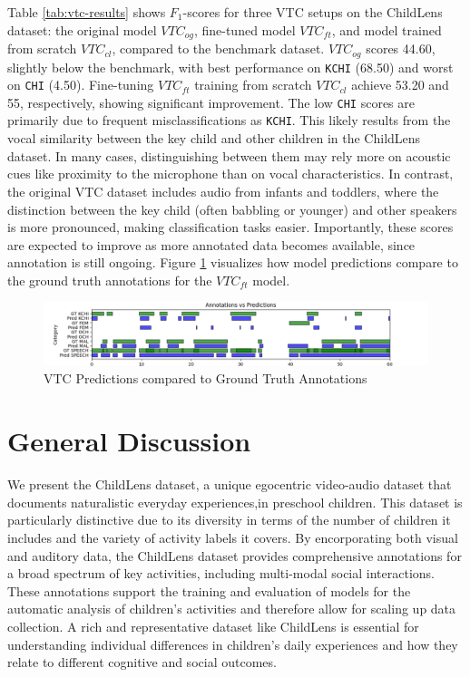 \documentclass[
  man,floatsintext]{apa6}
\begin{document}
Table \ref{tab:vtc-results} shows \(F_1\)-scores for three VTC setups on the ChildLens dataset: the original model \(VTC_{og}\), fine-tuned model \(VTC_{ft}\), and model trained from scratch \(VTC_{cl}\), compared to the benchmark dataset. \(VTC_{og}\) scores 44.60, slightly below the benchmark, with best performance on \texttt{KCHI} (68.50) and worst on \texttt{CHI} (4.50). Fine-tuning \(VTC_{ft}\) training from scratch \(VTC_{cl}\) achieve 53.20 and 55, respectively, showing significant improvement. The low \texttt{CHI} scores are primarily due to frequent misclassifications as \texttt{KCHI}. This likely results from the vocal similarity between the key child and other children in the ChildLens dataset. In many cases, distinguishing between them may rely more on acoustic cues like proximity to the microphone than on vocal characteristics. In contrast, the original VTC dataset includes audio from infants and toddlers, where the distinction between the key child (often babbling or younger) and other speakers is more pronounced, making classification tasks easier. Importantly, these scores are expected to improve as more annotated data becomes available, since annotation is still ongoing. Figure \ref{fig:vtc-evaluations} visualizes how model predictions compare to the ground truth annotations for the \(VTC_{ft}\) model.

\begin{figure}

{\centering \includegraphics[width=6.67in]{images/vtc_performance_evaluation} 

}

\caption{VTC Predictions compared to Ground Truth Annotations}\label{fig:vtc-evaluations}
\end{figure}

\section{General Discussion}\label{general-discussion}

We present the ChildLens dataset, a unique egocentric video-audio dataset that documents naturalistic everyday experiences,in preschool children. This dataset is particularly distinctive due to its diversity in terms of the number of children it includes and the variety of activity labels it covers. By encorporating both visual and auditory data, the ChildLens dataset provides comprehensive annotations for a broad spectrum of key activities, including multi-modal social interactions. These annotations support the training and evaluation of models for the automatic analysis of children's activities and therefore allow for scaling up data collection. A rich and representative dataset like ChildLens is essential for understanding individual differences in children's daily experiences and how they relate to different cognitive and social outcomes.
\end{document}
